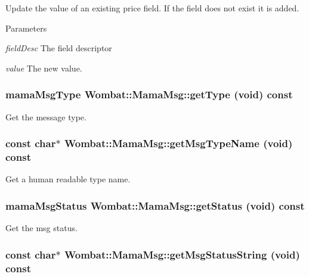 Update the value of an existing price field. If the field does not exist it is added.


\begin{DoxyParams}{Parameters}
\item[{\em fieldDesc}]The field descriptor \item[{\em value}]The new value. \end{DoxyParams}
\hypertarget{classWombat_1_1MamaMsg_a43f54147c0a703c4703a01fd959511d4}{
\subsubsection[{getType}]{\setlength{\rightskip}{0pt plus 5cm}mamaMsgType Wombat::MamaMsg::getType (void) const}}
\label{classWombat_1_1MamaMsg_a43f54147c0a703c4703a01fd959511d4}


Get the message type. \hypertarget{classWombat_1_1MamaMsg_a30d10190021418aa54a5e097cdf31717}{
\subsubsection[{getMsgTypeName}]{\setlength{\rightskip}{0pt plus 5cm}const char$\ast$ Wombat::MamaMsg::getMsgTypeName (void) const}}
\label{classWombat_1_1MamaMsg_a30d10190021418aa54a5e097cdf31717}


Get a human readable type name. \hypertarget{classWombat_1_1MamaMsg_a8488aaf5b82a3c1419eb1b199d5b1904}{
\subsubsection[{getStatus}]{\setlength{\rightskip}{0pt plus 5cm}mamaMsgStatus Wombat::MamaMsg::getStatus (void) const}}
\label{classWombat_1_1MamaMsg_a8488aaf5b82a3c1419eb1b199d5b1904}


Get the msg status. \hypertarget{classWombat_1_1MamaMsg_a9439fc6fd0a23211e00c12afe0b8ecad}{
\subsubsection[{getMsgStatusString}]{\setlength{\rightskip}{0pt plus 5cm}const char$\ast$ Wombat::MamaMsg::getMsgStatusString (void) const}}
\label{classWombat_1_1MamaMsg_a9439fc6fd0a23211e00c12afe0b8ecad}


